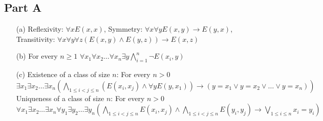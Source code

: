 \documentclass[10pt]{article}
\begin{document}
\subsection*{Part A}
\begin{itemize}
    \item [(a)] Reflexivity: $\forall x E(x,x)$, Symmetry: $\forall x\forall y E(x,y)\rightarrow E(y,x)$, Transitivity: $\forall x\forall y\forall z (E(x,y)\land E(y,z))\rightarrow E(x,z)$
    \item [(b)] For every $n\ge 1$ $\forall x_1\forall x_2\ldots\forall x_n\exists y\bigwedge_{i=1}^{n}\lnot E(x_i,y)$
    \item [(c)] Existence of a class of size $n$: For every $n>0$ $\exists x_1\exists x_2\ldots\exists x_n(\underset{1\le i<j\le n}{\bigwedge}(E(x_i,x_j)\land \forall y E(y,x_1))\rightarrow(y=x_1\lor y=x_2\lor\ldots\lor y=x_n))$\\
    Uniqueness of a class of size $n$: For every $n>0$ $\forall x_1\exists x_2\ldots\exists x_n\forall y_1\exists y_2\ldots \exists y_n(\underset{1\le i<j\le n}{\bigwedge}E(x_i,x_j)\land\underset{1\le i<j\le n}{\bigwedge}E(y_i,y_j)\rightarrow\underset{1\le i\le n}{\bigvee}x_i=y_i)$
\end{itemize}
\end{document}
